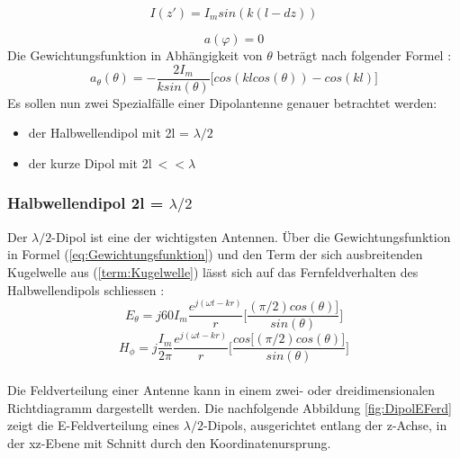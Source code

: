 \begin{equation}
I(z')=I_{m}sin(k(l-dz))
\end{equation}

\begin{equation}
a(\varphi)= 0
\end{equation}
Die Gewichtungsfunktion in Abhängigkeit von $\theta$ beträgt nach folgender Formel \cite{elliott1981antenna}:
\begin{equation}\label{eq:Gewichtungsfunktion}
a_{\theta}(\theta)=- \frac{2I_{m}}{k sin(\theta)} \Big\lbrack cos(kl cos(\theta)) - cos(kl) \Big\rbrack
\end{equation}
Es sollen nun zwei Spezialfälle einer Dipolantenne genauer betrachtet werden:
\begin{itemize}
\item der Halbwellendipol mit 2l = $\lambda/2$
\item der kurze Dipol mit 2l$ \ <<\lambda$
\end{itemize}
\newpage
\subsubsection{Halbwellendipol 2l = $\lambda/2$}
Der $\lambda/2$-Dipol ist eine der wichtigsten Antennen. Über die Gewichtungsfunktion in Formel (\ref{eq:Gewichtungsfunktion}) und den Term der sich ausbreitenden Kugelwelle aus (\ref{term:Kugelwelle}) lässt sich auf das Fernfeldverhalten des Halbwellendipols schliessen \cite{elliott1981antenna}:\\
\begin{equation}
E_{\theta}=j60I_{m} \frac{e^{j(\omega t - kr)}}{r} \biggl\lbrack \frac{  (\pi/2) cos(\theta)\rbrack}{sin(\theta)} \biggr\rbrack
\end{equation}
\begin{equation}
H_{\phi}=j \frac{I_{m}}{2\pi} \frac{e^{j(\omega t - kr)}}{r} \biggl\lbrack \frac{cos\lbrack  (\pi/2) cos(\theta)\rbrack}{sin(\theta)} \biggr\rbrack
\end{equation}\\
Die Feldverteilung einer Antenne kann in einem zwei- oder dreidimensionalen Richtdiagramm dargestellt werden. Die nachfolgende Abbildung \ref{fig:DipolEFerd} zeigt die E-Feldverteilung eines $\lambda/2$-Dipols, ausgerichtet entlang der z-Achse, in der xz-Ebene mit Schnitt durch den Koordinatenursprung.\\



